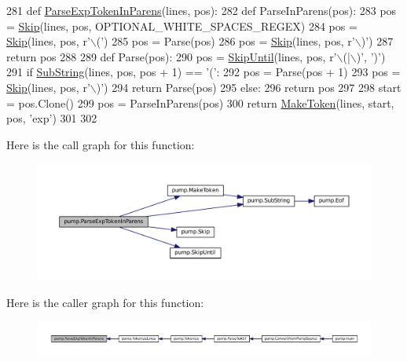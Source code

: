 \begin{DoxyCode}
281 \textcolor{keyword}{def }\hyperlink{namespacepump_ae094486db14ecec9347129c5f230042d}{ParseExpTokenInParens}(lines, pos):
282   \textcolor{keyword}{def }ParseInParens(pos):
283     pos = \hyperlink{namespacepump_a869bd8932d9ee97f3a0e789abd05d590}{Skip}(lines, pos, OPTIONAL\_WHITE\_SPACES\_REGEX)
284     pos = \hyperlink{namespacepump_a869bd8932d9ee97f3a0e789abd05d590}{Skip}(lines, pos, \textcolor{stringliteral}{r'\(\backslash\)('})
285     pos = Parse(pos)
286     pos = \hyperlink{namespacepump_a869bd8932d9ee97f3a0e789abd05d590}{Skip}(lines, pos, \textcolor{stringliteral}{r'\(\backslash\))'})
287     \textcolor{keywordflow}{return} pos
288 
289   \textcolor{keyword}{def }Parse(pos):
290     pos = \hyperlink{namespacepump_a8935d04d89047866b07c59845e2d7d29}{SkipUntil}(lines, pos, \textcolor{stringliteral}{r'\(\backslash\)(|\(\backslash\))'}, \textcolor{stringliteral}{')'})
291     \textcolor{keywordflow}{if} \hyperlink{namespacepump_a859edb180cfc24c24fabcfb4f2bedf9e}{SubString}(lines, pos, pos + 1) == \textcolor{stringliteral}{'('}:
292       pos = Parse(pos + 1)
293       pos = \hyperlink{namespacepump_a869bd8932d9ee97f3a0e789abd05d590}{Skip}(lines, pos, \textcolor{stringliteral}{r'\(\backslash\))'})
294       \textcolor{keywordflow}{return} Parse(pos)
295     \textcolor{keywordflow}{else}:
296       \textcolor{keywordflow}{return} pos
297 
298   start = pos.Clone()
299   pos = ParseInParens(pos)
300   \textcolor{keywordflow}{return} \hyperlink{namespacepump_af96d60dc97b160f3a18e63857aabeef7}{MakeToken}(lines, start, pos, \textcolor{stringliteral}{'exp'})
301 
302 
\end{DoxyCode}
Here is the call graph for this function\+:
\nopagebreak
\begin{figure}[H]
\begin{center}
\leavevmode
\includegraphics[width=350pt]{namespacepump_ae094486db14ecec9347129c5f230042d_cgraph}
\end{center}
\end{figure}
Here is the caller graph for this function\+:
\nopagebreak
\begin{figure}[H]
\begin{center}
\leavevmode
\includegraphics[width=350pt]{namespacepump_ae094486db14ecec9347129c5f230042d_icgraph}
\end{center}
\end{figure}
\mbox{\label{namespacepump_a56ac10a83a3a875d305c9aae71fc0549}} 
